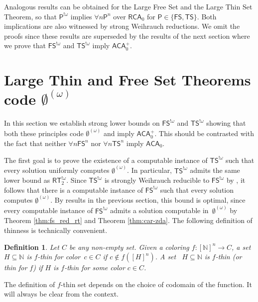 \documentclass{article}
\newcommand{\Psf}{\mathsf{P}}
\newcommand{\RCA}[0]{\mathsf{RCA}}
\newcommand{\ACA}[0]{\mathsf{ACA}}
\newcommand{\FS}[0]{\mathsf{FS}}
\newcommand{\TS}[0]{\mathsf{TS}}
\newcommand{\RT}[0]{\mathsf{RT}}
\newcommand{\NN}[0]{\mathbb{N}}
\numberwithin{theorem}{section}
\newtheorem{definition}[theorem]{Definition}
\newcommand{\ludovic}[1]{\textcolor{blue}{#1}}
\newcommand{\lorenzo}[1]{\textcolor{orange}{#1}}
\begin{document}
Analogous results can be obtained for the Large Free Set and the Large Thin Set Theorem, so that $\Psf^{!\omega}$ implies $\forall n \Psf^n$ over $\RCA_0$ for $\Psf\in\{\FS,\TS\}$. Both implications are also witnessed by strong Weihrauch reductions. We omit the proofs since these results are superseded by the results of the next section where we prove that $\FS^{!\omega}$ and $\TS^{!\omega}$ imply $\ACA_0^+$.


\section{Large Thin and Free Set Theorems code $\emptyset^{(\omega)}$}\label{sec:ts_fs_lowerbd}

In this section we establish strong lower bounds on $\FS^{!\omega}$ 
and $\TS^{!\omega}$ showing that both these principles code $\emptyset^{(\omega)}$ and imply $\ACA_0^+$. This should be contrasted with the fact that neither $\forall n \FS^n$ nor $\forall n \TS^n$ imply $\ACA_0$.

The first goal is to prove the existence of a computable instance of $\TS^{!\omega}$ such that every solution uniformly computes $\emptyset^{(\omega)}$. In particular, $\TS^{!\omega}$ admits the same lower bound as $\RT^{!\omega}_2$. Since $\TS^{!\omega}$ is strongly Weihrauch reducible to $\FS^{!\omega}$ by , it follows that there is a computable instance of $\FS^{!\omega}$ such that every solution computes $\emptyset^{(\omega)}$. 
By results in the previous section, this bound is optimal, since every computable instance of $\FS^{!\omega}$ admits a solution computable in~$\emptyset^{(\omega)}$ by Theorem \ref{thm:fs_red_rt} and Theorem \ref{thm:car-zda}. The following definition of thinness is technically convenient. 

\begin{definition}
Let $C$ be any non-empty set. Given a coloring $f : [\NN]^n \to C$, a set~$H \subseteq \NN$ is \emph{$f$-thin for color~$c \in C$} if $c \not \in f([H]^n)$. A set ~$H \subseteq \NN$ is $f$-thin (or thin for $f$) if $H$ is $f$-thin for some color $c\in C$.
\end{definition}

The definition of $f$-thin set depends on the choice of codomain of the function. It will always be clear from the context. 

\end{document}

